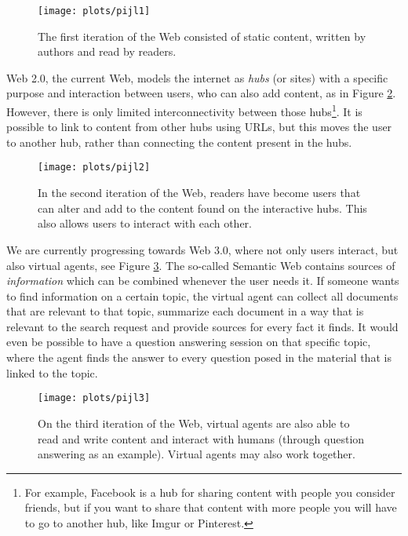 \documentclass{article}
\begin{document}
 \begin{figure}[H]
 \centering
 \texttt{[image: plots/pijl1]}
 \caption[Web 1.0]{The first iteration of the Web consisted of static content, written by authors and read by readers.}
 \label{web1}
 \end{figure}
 
 Web 2.0, the current Web, models the internet as \textit{hubs} (or sites) with a specific purpose and interaction between users, who can also add content, as in Figure \ref{web2}. However, there is only limited interconnectivity between those hubs\footnote{For example, Facebook is a hub for sharing content with people you consider friends, but if you want to share that content with more people you will have to go to another hub, like Imgur or Pinterest.}\cite{web2}.
 It is possible to link to content from other hubs using URLs, but this moves the user to another hub, rather than connecting the content present in the hubs.
 
 \begin{figure}[H]
 \centering
 \texttt{[image: plots/pijl2]}
 \caption[Web 2.0]{In the second iteration of the Web, readers have become users that can alter and add to the content found on the interactive hubs. This also allows users to interact with each other.}
 \label{web2}
 \end{figure}
 
 We are currently progressing towards Web 3.0, where not only users interact, but also virtual agents, see Figure \ref{web3}. The so-called Semantic Web contains sources of \textit{information} which can be combined whenever the user needs it. 
 If someone wants to find information on a certain topic, the virtual agent can collect all documents that are relevant to that topic, summarize each document in a way that is relevant to the search request and provide sources for every fact it finds. It would even be possible to have a question answering session on that specific topic, where the agent finds the answer to every question posed in the material that is linked to the topic.
 
 \begin{figure}[H]
 \centering
 \texttt{[image: plots/pijl3]}
 \caption[Web 3.0]{On the third iteration of the Web, virtual agents are also able to read and write content and interact with humans (through question answering as an example). Virtual agents may also work together.}
 \label{web3}
 \end{figure}
 
\end{document}
